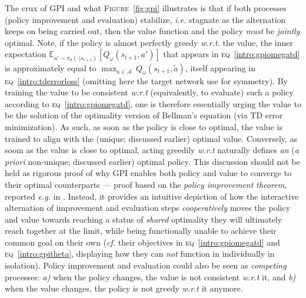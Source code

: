 The crux of GPI and what \textsc{Figure}~\ref{fig:gpi} illustrates is that if both processes
(policy improvement and evaluation) stabilize,
\textit{i.e.} stagnate as the alternation keeps on being carried out, then the value function
and the policy \emph{must} be \emph{jointly} optimal.
Note, if the policy is almost perfectly greedy \textit{w.r.t.} the value,
the inner expectation $\mathbb{E}_{a' \sim \pi_\theta(\cdot|s_{t+1})}[Q_\omega(s_{t+1},a')]$
that appears in \textsc{eq}~\ref{intro:gpiomegatd}
is approximately equal
to $\max_{\tilde{a} \in \mathcal{A}} \, Q_\omega(s_{t+1},\tilde{a})$,
itself appearing in \textsc{eq}~\ref{intro:tderrorloss} (omitting here the target network use for symmetry).
By training the value to be consistent \textit{w.r.t} (equivalently, to evaluate) such a policy
according to \textsc{eq}~\ref{intro:gpiomegatd},
one is therefore essentially urging the value to be the solution of the optimality version of Bellman's equation
(via TD error minimization).
As such, as soon as the policy is close to optimal, the value is trained to align with the
(unique; discussed earlier) optimal value.
Conversely, as soom as the value is close to optimal, acting greedily \textit{w.r.t} naturally defines
\emph{an} (\textit{a priori} non-unique; discussed earlier) optimal policy.
This discussion should not be held as rigorous proof of why GPI enables both policy and value to
converge to their optimal counterparts
--- proof based on the \textit{policy improvement theorem}, reported \textit{e.g.} in \cite{Sutton1998-ow}.
Instead, it provides an intuitive depiction of how the interactive
alternation of improvement and evaluation steps
\emph{cooperatively} moves the policy and value towards reaching a status of \emph{shared} optimality
they will ultimately reach together at the limit,
while being functionally unable to achieve their common goal on their own
(\textit{cf.} their objectives in \textsc{eq}~\ref{intro:gpiomegatd} and \textsc{eq}~\ref{intro:gpitheta},
displaying how they can \emph{not} function in individually in isolation).
Policy improvement and evaluation could also be seen as \emph{competing} processes:
\textit{a)} when the policy changes, the value is not consistent \textit{w.r.t} it, and
\textit{b)} when the value changes, the policy is not greedy \textit{w.r.t} it anymore.


